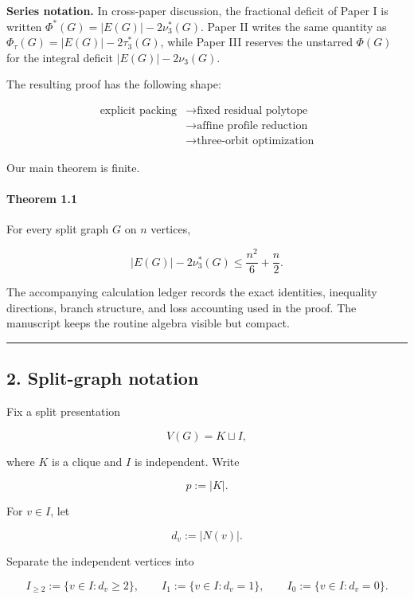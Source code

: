 \documentclass[english,11pt,a4paper]{article}
\begin{document}
\textbf{Series notation.} In cross-paper discussion, the fractional
deficit of Paper I is written \(\Phi^*(G)=|E(G)|-2\nu_3^*(G)\). Paper II
writes the same quantity as \(\Phi_\tau(G)=|E(G)|-2\tau_3^*(G)\), while
Paper III reserves the unstarred \(\Phi(G)\) for the integral deficit
\(|E(G)|-2\nu_3(G)\).

The resulting proof has the following shape:

\[
\begin{aligned}
\text{explicit packing}
&\longrightarrow
\text{fixed residual polytope}\\
&\longrightarrow
\text{affine profile reduction}\\
&\longrightarrow
\text{three-orbit optimization}
\end{aligned}
\]

Our main theorem is finite.

\paragraph{Theorem 1.1}\label{theorem-1.1}

For every split graph \(G\) on \(n\) vertices,

\[
|E(G)|-2\nu_3^*(G)
\le
\frac{n^2}{6}+\frac{n}{2}.
\]

The accompanying calculation ledger records the exact identities,
inequality directions, branch structure, and loss accounting used in the
proof. The manuscript keeps the routine algebra visible but compact.

\begin{center}\rule{0.5\linewidth}{0.5pt}\end{center}

\subsection{2. Split-graph notation}\label{split-graph-notation}

Fix a split presentation

\[
V(G)=K\sqcup I,
\]

where \(K\) is a clique and \(I\) is independent. Write

\[
p:=|K|.
\]

For \(v\in I\), let

\[
d_v:=|N(v)|.
\]

Separate the independent vertices into

\[
I_{\ge2}:=\{v\in I:d_v\ge2\},
\qquad
I_1:=\{v\in I:d_v=1\},
\qquad
I_0:=\{v\in I:d_v=0\}.
\]
\end{document}
